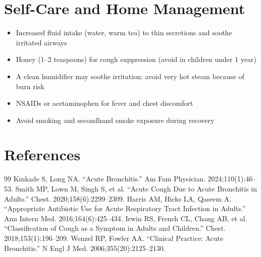 \section*{Self-Care and Home Management}
\begin{itemize}
 \item Increased fluid intake (water, warm tea) to thin secretions and soothe irritated airways
 \item Honey (1--2 teaspoons) for cough suppression (avoid in children under 1 year)
 \item A clean humidifier may soothe irritation; avoid very hot steam because of burn risk
 \item NSAIDs or acetaminophen for fever and chest discomfort
 \item Avoid smoking and secondhand smoke exposure during recovery
\end{itemize}

\section*{References}
\begin{thebibliography}{99}
 Kinkade S, Long NA. ``Acute Bronchitis.'' Am Fam Physician. 2024;110(1):46--53.
 Smith MP, Lown M, Singh S, et al. ``Acute Cough Due to Acute Bronchitis in Adults.'' Chest. 2020;158(6):2299--2309.
 Harris AM, Hicks LA, Qaseem A. ``Appropriate Antibiotic Use for Acute Respiratory Tract Infection in Adults.'' Ann Intern Med. 2016;164(6):425--434.
 Irwin RS, French CL, Chang AB, et al. ``Classification of Cough as a Symptom in Adults and Children.'' Chest. 2018;153(1):196--209.
 Wenzel RP, Fowler AA. ``Clinical Practice: Acute Bronchitis.'' N Engl J Med. 2006;355(20):2125--2130.
\end{thebibliography}
